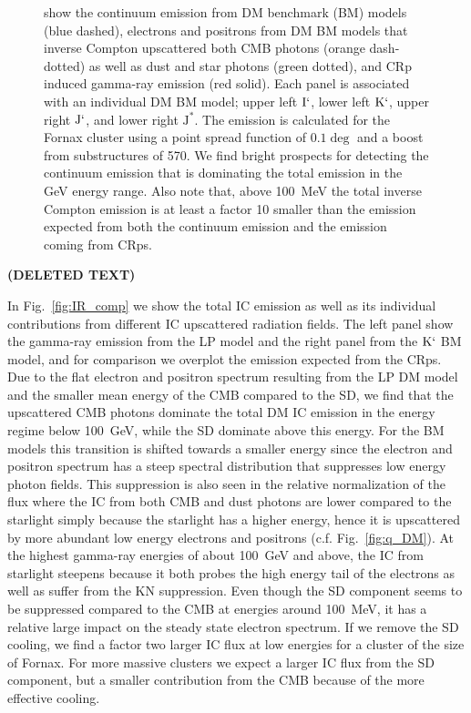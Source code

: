 \documentclass[10pt,aps,pra,reprint,amsmath,amsfonts,amssymb,showpacs]{revtex4-1}
\def\del#1{{\bf (DELETED TEXT)}}
\newcommand{\rmn}{\mathrm}
\newcommand{\Kp}{\rmn{K}`}
\newcommand{\Ip}{\rmn{I}`}
\newcommand{\Js}{\rmn{J}^*}
\newcommand{\Jp}{\rmn{J}`}
\begin{document}
\begin{figure}
\begin{minipage}{2.0\columnwidth}
{  show the continuum emission from DM benchmark (BM) models (blue
  dashed), electrons and positrons from DM BM models that inverse
  Compton upscattered both CMB photons (orange dash-dotted) as well as
  dust and star photons (green dotted), and CRp induced gamma-ray
  emission (red solid). Each panel is associated with an individual DM
  BM model; upper left $\Ip$, lower left $\Kp$, upper right $\Jp$, and
  lower right $\Js$. The emission is calculated for the Fornax cluster
  using a point spread function of $0.1\deg$ and a boost from
  substructures of 570. We find bright prospects for detecting the
  continuum emission that is dominating the total emission in the GeV
  energy range. Also note that, above 100~MeV the total inverse
  Compton emission is at least a factor 10 smaller than the emission
  expected from both the continuum emission and the emission coming
  from CRps.}
 \label{fig:diff_BM}
\end{minipage}
\end{figure}

\del{CONSIDER REWRITING, START WITH PHYSICS, THEN DISCUSS DOMINATING
CONTRIBUTIONS, PEAKS, AND SPECTRAL INDICES}

In Fig.~\ref{fig:IR_comp} we show the total IC emission as well as its
individual contributions from different IC upscattered radiation
fields. The left panel show the gamma-ray emission from the LP model
and the right panel from the $\Kp$ BM model, and for comparison we
overplot the emission expected from the CRps. Due to the flat electron
and positron spectrum resulting from the LP DM model and the smaller
mean energy of the CMB compared to the SD, we find that the
upscattered CMB photons dominate the total DM IC emission in the
energy regime below 100~GeV, while the SD dominate above this
energy. For the BM models this transition is shifted towards a smaller
energy since the electron and positron spectrum has a steep spectral
distribution that suppresses low energy photon fields. This
suppression is also seen in the relative normalization of the flux
where the IC from both CMB and dust photons are lower compared to the
starlight simply because the starlight has a higher energy, hence it
is upscattered by more abundant low energy electrons and positrons
(c.f. Fig.~\ref{fig:q_DM}). At the highest gamma-ray energies of about
100~GeV and above, the IC from starlight steepens because it both
probes the high energy tail of the electrons as well as suffer from
the KN suppression. Even though the SD component seems to be
suppressed compared to the CMB at energies around 100~MeV, it has a
relative large impact on the steady state electron spectrum. If we
remove the SD cooling, we find a factor two larger IC flux at low
energies for a cluster of the size of Fornax. For more massive
clusters we expect a larger IC flux from the SD component, but a
smaller contribution from the CMB because of the more effective
cooling.
\end{document}
